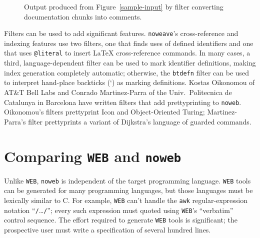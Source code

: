 \begin{figure}
\caption{Output produced from 
Figure~\protect\ref{sample-input} by filter converting documentation
chunks into comments.}
\label{nountangle-output}
\end{figure}



Filters can be used to add significant features.
\verb+noweave+'s cross-reference and indexing features use two
filters, one that finds uses of defined identifiers and one that 
uses \verb+@literal+ to insert {\LaTeX} cross-reference
commands.
In many cases, a third, language-dependent filter can be used to
mark identifier definitions,
making index generation completely automatic;
otherwise, the \verb+btdefn+ filter can be used to interpret
hand-place backticks (`) as marking definitions.
Kostas Oikonomou of AT\&T Bell Labs and Conrado Martinez-Parra of 
the Univ.\ Politecnica de Catalunya in Barcelona have written filters
that add prettyprinting to {\tt noweb}.
Oikonomou's filters prettyprint Icon and Object-Oriented Turing;
Martinez-Parra's filter prettyprints a variant of Dijkstra's language
of guarded commands.


\section{Comparing {\tt WEB} and {\tt noweb}}

Unlike {\tt WEB},
\verb+noweb+ is independent of the target programming language.
{\tt WEB} tools can be generated for many programming languages, 
but those languages must be lexically similar to C.
For example, {\tt WEB} can't handle the \verb+awk+ regular-expression
notation ``\verb+/+\ldots\verb+/+''; every such expression must quoted
using {\tt WEB}'s ``verbatim'' control sequence.
The effort required to 
generate {\tt WEB} tools is significant; the prospective user must
write a specification of several hundred 
lines.

